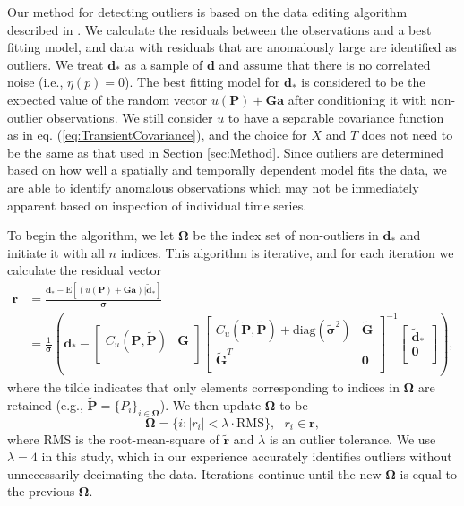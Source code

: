 \documentclass[10pt,letter]{article}
\begin{document}
Our method for detecting outliers is based on the data editing algorithm described in \citet{Gibbs2011}. We calculate the residuals between the observations and a best fitting model, and data with residuals that are anomalously large are identified as outliers. We treat $\bm{d}_*$ as a sample of $\bm{d}$ and assume that there is no correlated noise (i.e., $\eta(p) = 0$).  The best fitting model for $\bm{d}_*$ is considered to be the expected value of the random vector $u(\bm{P}) + \bm{G}\bm{a}$ after conditioning it with non-outlier observations.  We still consider $u$ to have a separable covariance function as in eq. (\ref{eq:TransientCovariance}), and the choice for $X$ and $T$ does not need to be the same as that used in Section \ref{sec:Method}. Since outliers are determined based on how well a spatially and temporally dependent model fits the data, we are able to identify anomalous observations which may not be immediately apparent based on inspection of individual time series. 

To begin the algorithm, we let $\bm{\Omega}$ be the index set of non-outliers in $\bm{d}_*$ and initiate it with all $n$ indices. This algorithm is iterative, and for each iteration we calculate the residual vector
\begin{align}\label{eq:Residual}
\bm{r} &= \frac{\bm{d}_* - \mathrm{E}\left[(u(\bm{P}) + \bm{G}\bm{a})|\tilde{\bm{d}}_* \right]}{\bm{\sigma}} \\
       &= \frac{1}{\bm{\sigma}}\left(\bm{d}_*  - 
          \left[\begin{array}{cc}
                C_u(\bm{P},\tilde{\bm{P}}) & \bm{G} \\
                \end{array}\right]
          \left[\begin{array}{cc}
                C_u(\tilde{\bm{P}},\tilde{\bm{P}}) + \mathrm{diag}(\tilde{\bm{\sigma}}^2) & \tilde{\bm{G}} \\
                \tilde{\bm{G}}^T  & \bm{0} \\
                \end{array}\right]^{-1}
          \left[\begin{array}{c}
                \tilde{\bm{d}}_* \\
                \bm{0} \\
                \end{array}\right]\right),
\end{align}
where the tilde indicates that only elements corresponding to indices in $\bm{\Omega}$ are retained (e.g., $\tilde{\bm{P}} = \{P_i\}_{i\in\bm{\Omega}}$). We then update $\bm{\Omega}$ to be
\begin{equation}\label{eq:Update}
\bm{\Omega} = \{i : |r_i| < \lambda \cdot \mathrm{RMS}\}, \ \ \ r_i \in \bm{r},
\end{equation} 
where RMS is the root-mean-square of $\tilde{\bm{r}}$ and $\lambda$ is an outlier tolerance. We use $\lambda=4$ in this study, which in our experience accurately identifies outliers without unnecessarily decimating the data. Iterations continue until the new $\bm{\Omega}$ is equal to the previous $\bm{\Omega}$. 
\end{document}
